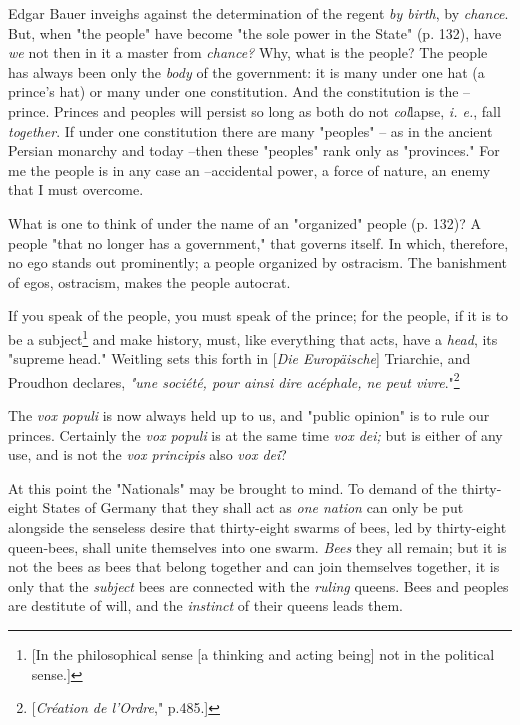 \documentclass[a4paper]{book}
\begin{document}
Edgar Bauer inveighs against the determination of the regent \textit{by 
birth}, by \textit{chance}. But, when "{}the people"{} have become "{}the sole 
power in the State"{} (p. 132), have \textit{we} not then in it a master from 
\textit{chance?} Why, what is the people? The people has always been only the 
\textit{body} of the government: it is many under one hat (a prince's hat) or 
many under one constitution. And the constitution is the -- prince. Princes 
and peoples will persist so long as both do not \textit{col}lapse, \textit{i. 
e.}, fall \textit{together}. If under one constitution there are many 
"{}peoples"{} -- as in the ancient Persian monarchy and today --then these 
"{}peoples"{} rank only as "{}provinces."{} For me the people is in any case 
an --accidental power, a force of nature, an enemy that I must overcome.

What is one to think of under the name of an "{}organized"{} people (p. 132)? 
A people "{}that no longer has a government,"{} that governs itself. In which, 
therefore, no ego stands out prominently; a people organized by ostracism. The 
banishment of egos, ostracism, makes the people autocrat.

If you speak of the people, you must speak of the prince; for the people, if 
it is to be a subject\footnote{[In the philosophical sense [a thinking and 
acting being] not in the political sense.]} and make history, must, like 
everything that acts, have a \textit{head}, its "{}supreme head."{} Weitling 
sets this forth in [\textit{Die Europ\"aische}] Triarchie, and Proudhon 
declares, \textit{"{}une soci\'et\'e, pour ainsi dire ac\'ephale, ne peut 
vivre}."{}\footnote{[\textit{Cr\'eation de l'Ordre},"{} p.485.]}

The \textit{vox populi} is now always held up to us, and "{}public opinion"{} 
is to rule our princes. Certainly the \textit{vox populi} is at the same time 
\textit{vox dei;} but is either of any use, and is not the \textit{vox 
principis} also \textit{vox dei}?

At this point the "{}Nationals"{} may be brought to mind. To demand of the 
thirty-eight States of Germany that they shall act as \textit{one nation} can 
only be put alongside the senseless desire that thirty-eight swarms of bees, 
led by thirty-eight queen-bees, shall unite themselves into one swarm. 
\textit{Bees} they all remain; but it is not the bees as bees that belong 
together and can join themselves together, it is only that the 
\textit{subject} bees are connected with the \textit{ruling} queens. Bees and 
peoples are destitute of will, and the \textit{instinct} of their queens leads 
them.
\end{document}
